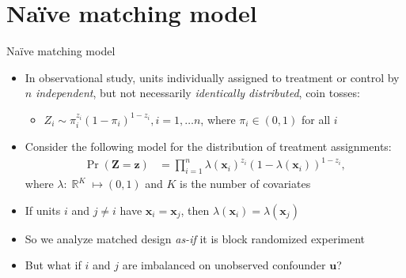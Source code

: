 \documentclass[table, xcolor={dvipsnames}, 9pt]{beamer}
\theoremstyle{newstyle}
\DeclareMathOperator{\R}{\mathbb{R}}
\begin{document}
\section{Na\"{i}ve matching model}
\begin{frame}{Na\"{i}ve matching model}
\vfill
\begin{itemize} \vfill
\item In observational study, units individually assigned to treatment or control by $n$ \textit{independent}, but not necessarily \textit{identically distributed}, coin tosses: \vfill
\begin{itemize} \vfill
\item $Z_i \sim \pi_i^{z_i} \left(1 - \pi_i\right)^{1 - z_i}, i = 1, \dots n$, where $\pi_i \in (0, 1)$ for all $i$ \vfill
\end{itemize} \vfill
\item  Consider the following model for the distribution of treatment assignments:  \vfill
\begin{align*} 
\Pr\left(\mathbf{Z} = \mathbf{z}\right) & = \prod \limits_{i = 1}^n \lambda\left(\mathbf{x}_i\right)^{z_i} \left(1 - \lambda\left(\mathbf{x}_i\right)\right)^{1 - z_i},
\end{align*}
where $\lambda: \R^K \mapsto (0, 1)$ and $K$ is the number of covariates \vfill
\item  If units $i$ and $j \neq i$ have $\bm{x}_i = \bm{x}_j$, then $\lambda\left(\mathbf{x}_i \right) = \lambda\left(\mathbf{x}_j \right)$ \vfill
\item  So we analyze matched design \textit{as-if} it is block randomized experiment \vfill
\item But what if $i$ and $j$ are imbalanced on unobserved confounder $\bm{u}$? \vfill
\end{itemize} \vfill
\end{frame}
\end{document}
